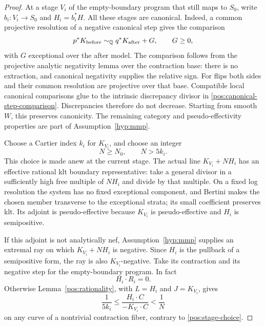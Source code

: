 \begin{proof}
At a stage \(V_i\) of the empty-boundary program that still maps to
\(S_0\), write \(b_i:V_i\to S_0\) and \(H_i=b_i^*H\).
All these stages are canonical. Indeed, a common projective resolution
of a negative canonical step gives the comparison
\begin{equation}\label{pos:canonical-step-comparison}
 p^*K_{\mathrm{before}}\sim_{\mathbb{Q}}q^*K_{\mathrm{after}}+G,
 \qquad G\geq0,
\end{equation}
with \(G\) exceptional over the after model. The comparison follows
from the projective analytic negativity lemma over the contraction
base: there is no extraction, and canonical negativity supplies the
relative sign. For flips both sides and their common resolution are
projective over that base. Compatible local canonical comparisons
glue to the intrinsic discrepancy divisor in
\eqref{pos:canonical-step-comparison}. Discrepancies therefore do not
decrease. Starting from smooth \(W\), this preserves canonicity. The
remaining category and pseudo-effectivity properties are part of
Assumption~\ref{hyp:mmp}.

Choose a Cartier index \(k_i\) for \(K_{V_i}\), and choose an integer
\begin{equation}\label{pos:stage-choice}
 N\geq N_0,\qquad N>5k_i.
\end{equation}
This choice is made anew at the current stage. The actual line
\(K_{V_i}+NH_i\) has an effective rational klt boundary representative:
take a general divisor in a sufficiently high free multiple of
\(NH_i\) and divide by that multiple. On a fixed log resolution the
system has no fixed exceptional component, and Bertini makes the
chosen member transverse to the exceptional strata; its small
coefficient preserves klt. Its adjoint is pseudo-effective because
\(K_{V_i}\) is pseudo-effective and \(H_i\) is semipositive.

If this adjoint is not analytically nef, Assumption~\ref{hyp:mmp}
supplies an extremal ray on which \(K_{V_i}+NH_i\) is negative.
Since \(H_i\) is the pullback of a semipositive form, the ray is also
\(K_{V_i}\)-negative. Take its contraction and its negative step for
the empty-boundary program. In fact
\begin{equation}\label{pos:base-line-zero-on-ray}
 H_i\cdot R_i=0.
\end{equation}
Otherwise Lemma~\ref{pos:rationality}, with \(L=H_i\) and
\(J=K_{V_i}\), gives
\[
 \frac{1}{5k_i}
 \leq\frac{H_i\cdot C}{-K_{V_i}\cdot C}
 <\frac1N
\]
on any curve of a nontrivial contraction fiber, contrary to
\eqref{pos:stage-choice}.


\end{proof}
